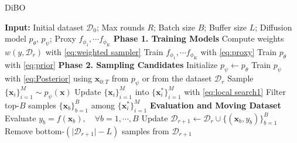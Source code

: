 \begin{algorithm}[t]
\caption{DiBO}
\label{alg}
\begin{algorithmic}[1]
    \STATE \textbf{Input:} 
        Initial dataset \(\mathcal{D}_0\);
        Max rounds \(R\);
        Batch size \(B\); 
        Buffer size \(L\); 
        Diffusion model $p_{\theta}$, $p_{\psi}$;
        Proxy $f_{\phi_1},\cdots f_{\phi_K}$
        \STATE \textbf{Phase 1. Training Models}
        \STATE Compute weights $w(y, \mathcal{D}_r)$ with \cref{eq:weighted sampler}
        \STATE Train $f_{\phi_1},\cdots f_{\phi_K}$ with \cref{eq:proxy}
        \STATE Train $p_{\theta}$ with \cref{eq:prior}
        \STATE
        \STATE \textbf{Phase 2. Sampling Candidates}
        \STATE Initialize $p_{\psi}\leftarrow p_{\theta}$
        \STATE Train  $p_\psi$ with \cref{eq:Posterior} using $\mathbf{x}_{0:T}$ from $p_{\psi}$ or from the dataset $\mathcal{D}_r$
        \STATE Sample \(\{\mathbf{x}_i\}_{i=1}^M \sim p_\psi(\mathbf{x})\)
        \STATE Update \(\{\mathbf{x}_i\}_{i=1}^M\) into \(\{\mathbf{x}_i^{*}\}_{i=1}^M\) with \cref{eq:local search1}
        \STATE Filter top-$B$ samples \(\{\mathbf{x}_b\}_{b=1}^B\) among \(\{\mathbf{x}_i^{*}\}_{i=1}^M\)
        \STATE
        \STATE \textbf{Evaluation and Moving Dataset}
        \STATE Evaluate $y_b=f(\mathbf{x}_b),\quad\forall b=1,\cdots,B$
        \STATE Update \(\mathcal{D}_{r+1} \leftarrow\mathcal{D}_r\cup\{(\mathbf{x}_b, y_b)\}_{b=1}^B\)
            \STATE Remove bottom-$(\vert\mathcal{D}_{r+1}\vert-L)$ samples from $\mathcal{D}_{r+1}$
        \ENDIF
    \ENDFOR
\end{algorithmic}
\end{algorithm}